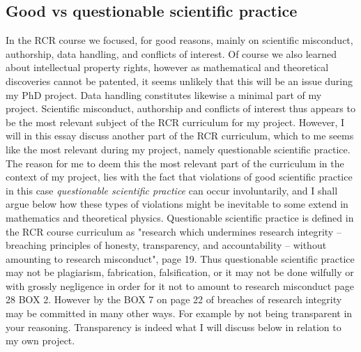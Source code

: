 \documentclass[a4paper, 11pt]{article} %
\begin{document}
\subsection*{Good vs questionable scientific practice}
In the RCR course we focused, for good reasons, mainly on scientific misconduct, authorship, data handling, and conflicts of interest. Of course we also learned about intellectual property rights, however as mathematical and theoretical discoveries cannot be patented, it seems unlikely that this will be an issue during my PhD project. Data handling constitutes likewise a minimal part of my project. Scientific misconduct, authorship and conflicts of interest thus appears to be the most relevant subject of the RCR curriculum for my project. However, I will in this essay discuss another part of the RCR curriculum, which to me seems like the most relevant during my project, namely questionable scientific practice. The reason for me to deem this the most relevant part of the curriculum in the context of my project, lies with the fact that violations of good scientific practice in this case \emph{questionable scientific practice} can occur involuntarily, and I shall argue below how these types of violations might be inevitable to some extend in mathematics and theoretical physics. Questionable scientific practice is defined in the RCR course curriculum as "research which undermines research integrity – breaching principles of honesty, transparency, and
accountability – without amounting to research misconduct", \cite{4d9ee36a3be642848d14f8517fe0f94c} page 19. Thus questionable scientific practice may not be plagiarism, fabrication, falsification, or it may not be done wilfully or with grossly negligence in order for it not to amount to research misconduct \cite{4d9ee36a3be642848d14f8517fe0f94c} page 28 BOX 2. However by the BOX 7 on page 22 of \cite{4d9ee36a3be642848d14f8517fe0f94c} breaches of research integrity may be committed in many other ways. For example by not being transparent in your reasoning. Transparency is indeed what I will discuss below in relation to my own project.
\end{document}
